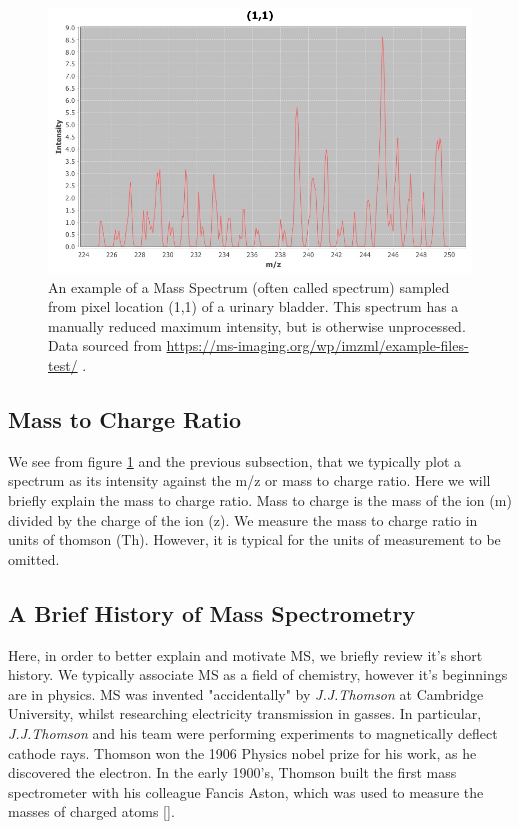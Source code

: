 \documentclass[11pt,openany]{book}
\begin{document}
\begin{figure}
    \centering
    \includegraphics[scale=0.4]{./images/urinary_bladder_(1,1)_unprocessed.jpeg}
    \caption{An example of a Mass Spectrum (often called spectrum) sampled from pixel location (1,1) of a urinary bladder. This spectrum has a manually reduced maximum intensity, but is otherwise unprocessed. Data sourced from \url{https://ms-imaging.org/wp/imzml/example-files-test/} \cite{imzml.org}.}
    \label{fig:unprocessed_urinary_bladder_spectrum}
\end{figure}

\subsection{Mass to Charge Ratio}
We see from figure \ref{fig:unprocessed_urinary_bladder_spectrum} and the previous subsection, that we typically plot a spectrum as its intensity against the m/z or mass to charge ratio. Here we will briefly explain the mass to charge ratio. Mass to charge is the mass of the ion (m)
divided by the charge of the ion (z). We measure the mass to charge ratio in 
units of thomson (Th). However, it is typical for the units of measurement to be omitted.  
 
\subsection{A Brief History of Mass Spectrometry}
Here, in order to better explain and motivate MS, we briefly review it's short history. We typically associate MS as a field of chemistry, however it's beginnings are in physics. MS was invented "accidentally" by \textit{J.J.Thomson} at Cambridge University, whilst researching electricity transmission in gasses. In particular, \textit{J.J.Thomson} and his team were performing experiments to magnetically deflect cathode rays. Thomson won the 1906 Physics nobel prize for his work, as he discovered the electron. In the early 1900's, Thomson built the first mass spectrometer with his colleague Fancis Aston, which was used to measure the masses of charged atoms [\cite{history_of_ms_anal_chem}].
\end{document}
